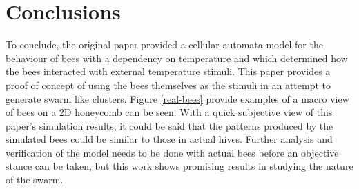 \documentclass[conference,compsoc,onecolumn]{IEEEtran}
\begin{document}
\section{Conclusions}\label{conclusion}

To conclude, the original paper provided a cellular automata model for the behaviour of bees with a dependency on temperature and which determined how the bees interacted with external temperature stimuli. This paper provides a proof of concept of using the bees themselves as the stimuli in an attempt to generate swarm like clusters. Figure \ref{real-bees} provide examples of a macro view of bees on a 2D honeycomb can be seen. With a quick subjective view of this paper's simulation results, it could be said that the patterns produced by the simulated bees could be similar to those in actual hives. Further analysis and verification of the model needs to be done with actual bees before an objective stance can be taken, but this work shows promising results in studying the nature of the swarm.
\end{document}
